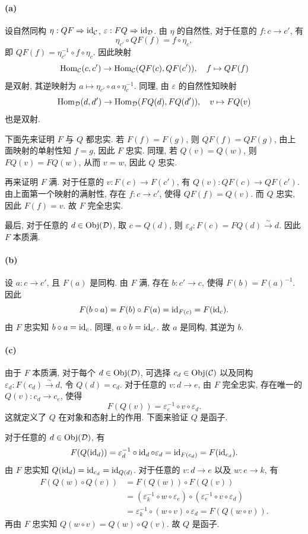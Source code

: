 \documentclass{article}
\begin{document}
\begin{solution}
	\paragraph{(a)} 设自然同构 $\eta: QF \Rightarrow \operatorname{id}_{\mathcal C}$, $\varepsilon: FQ \Rightarrow \operatorname{id}_{\mathcal D}$. 由 $\eta$ 的自然性, 对于任意的 $f: c \to c'$, 有
	\[ \eta_{c'} \circ QF(f) = f \circ \eta_c, \]
	即 $QF(f) = \eta_{c'}^{-1} \circ f \circ \eta_c$. 因此映射
	\[ \operatorname{Hom}_{\mathcal C}(c, c') \to \operatorname{Hom}_{\mathcal C}(QF(c), QF(c')), \quad f \mapsto QF(f) \]
	是双射, 其逆映射为 $a \mapsto \eta_{c'} \circ a \circ \eta_c^{-1}$. 同理, 由 $\varepsilon$ 的自然性知映射
	\[ \operatorname{Hom}_{\mathcal D}(d, d') \to \operatorname{Hom}_{\mathcal D}(FQ(d), FQ(d')), \quad v \mapsto FQ(v) \]
	也是双射.

	下面先来证明 $F$ 与 $Q$ 都忠实. 若 $F(f) = F(g)$, 则 $QF(f) = QF(g)$, 由上面映射的单射性知 $f = g$, 因此 $F$ 忠实. 同理, 若 $Q(v) = Q(w)$, 则 $FQ(v) = FQ(w)$, 从而 $v = w$, 因此 $Q$ 忠实.

	再来证明 $F$ 满. 对于任意的 $v: F(c) \to F(c')$, 有 $Q(v): QF(c) \to QF(c')$. 由上面第一个映射的满射性, 存在 $f: c \to c'$, 使得 $QF(f) = Q(v)$. 而 $Q$ 忠实, 因此 $F(f) = v$. 故 $F$ 完全忠实.

	最后, 对于任意的 $d \in \operatorname{Obj}(\mathcal D)$, 取 $c = Q(d)$, 则 $\varepsilon_d: F(c) = FQ(d) \xrightarrow{\sim} d$. 因此 $F$ 本质满.

	\paragraph{(b)} 设 $a: c \to c'$, 且 $F(a)$ 是同构. 由 $F$ 满, 存在 $b: c' \to c$, 使得 $F(b) = F(a)^{-1}$. 因此
	\[ F(b \circ a) = F(b) \circ F(a) = \operatorname{id}_{F(c)} = F(\operatorname{id}_c). \]
	由 $F$ 忠实知 $b \circ a = \operatorname{id}_c$. 同理, $a \circ b = \operatorname{id}_{c'}$. 故 $a$ 是同构, 其逆为 $b$.

	\paragraph{(c)} 由于 $F$ 本质满, 对于每个 $d \in \operatorname{Obj}(\mathcal D)$, 可选择 $c_d \in \operatorname{Obj}(\mathcal C)$ 以及同构 $\varepsilon_d: F(c_d) \xrightarrow{\sim} d$, 令 $Q(d) = c_d$. 对于任意的 $v: d \to e$, 由 $F$ 完全忠实, 存在唯一的 $Q(v): c_d \to c_e$, 使得
	\[ F(Q(v)) = \varepsilon_e^{-1} \circ v \circ \varepsilon_d. \]
	这就定义了 $Q$ 在对象和态射上的作用. 下面来验证 $Q$ 是函子.

	对于任意的 $d \in \operatorname{Obj}(\mathcal D)$, 有
	\[ F(Q(\operatorname{id}_d)) = \varepsilon_d^{-1} \circ \operatorname{id}_d \circ \varepsilon_d = \operatorname{id}_{F(c_d)} = F(\operatorname{id}_{c_d}). \]
	由 $F$ 忠实知 $Q(\operatorname{id}_d) = \operatorname{id}_{c_d} = \operatorname{id}_{Q(d)}$. 对于任意的 $v: d \to e$ 以及 $w: e \to k$, 有
	\[ \begin{aligned}
		F(Q(w) \circ Q(v)) &= F(Q(w)) \circ F(Q(v)) \\
		&= (\varepsilon_k^{-1} \circ w \circ \varepsilon_e) \circ (\varepsilon_e^{-1} \circ v \circ \varepsilon_d) \\
		&= \varepsilon_k^{-1} \circ (w \circ v) \circ \varepsilon_d = F(Q(w \circ v)).
	\end{aligned} \]
	再由 $F$ 忠实知 $Q(w \circ v) = Q(w) \circ Q(v)$. 故 $Q$ 是函子.


\end{solution}
\end{document}
